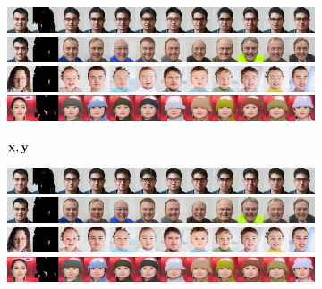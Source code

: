 \begin{figure}[t]
  \centering
  \begin{subfigure}[t]{0.14\textwidth}
    \centering
    \includegraphics[trim=0px 0px 2560px 0px, clip, height=\cmgfailureimgheight]{figs/cigcvae/co_mod_gan_failure/co_mod_gan_0_3_2.jpg}
    \includegraphics[trim=0px 0px 2560px 0px, clip, height=\cmgfailureimgheight]{figs/cigcvae/co_mod_gan_failure/co_mod_gan_0_4_2.jpg}
    \includegraphics[trim=0px 0px 2560px 0px, clip, height=\cmgfailureimgheight]{figs/cigcvae/co_mod_gan_failure/co_mod_gan_1_4_2.jpg}
    \includegraphics[trim=0px 0px 2560px 0px, clip, height=\cmgfailureimgheight]{figs/cigcvae/co_mod_gan_failure/co_mod_gan_56_4_12.jpg}
    \caption{${\mathbf{x}}, {\mathbf{y}}$}
  \end{subfigure}
  \begin{subfigure}[t]{0.73\textwidth}
    \centering
    \includegraphics[trim=512px 0px 0px 0px, clip, height=\cmgfailureimgheight]{figs/cigcvae/co_mod_gan_failure/co_mod_gan_0_3_2.jpg}
    \includegraphics[trim=512px 0px 0px 0px, clip, height=\cmgfailureimgheight]{figs/cigcvae/co_mod_gan_failure/co_mod_gan_0_4_2.jpg}
    \includegraphics[trim=512px 0px 0px 0px, clip, height=\cmgfailureimgheight]{figs/cigcvae/co_mod_gan_failure/co_mod_gan_1_4_2.jpg}
    \includegraphics[trim=512px 0px 0px 0px, clip, height=\cmgfailureimgheight]{figs/cigcvae/co_mod_gan_failure/co_mod_gan_56_4_12.jpg}

\end{subfigure}
\end{figure}
